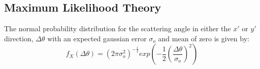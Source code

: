 \documentclass[a4paper,11pt]{article}
\begin{document}














\subsection{Maximum Likelihood Theory}\label{likelihood_theory_section}

The normal probability distribution for the scattering angle in either the $x'$ or $y'$ direction, $\Delta\theta$ with an expected gaussian error $\sigma_o$ and mean of zero is given by:
\begin{equation}
f_X(\Delta\theta) = (2\pi\sigma_o^2)^{-\frac{1}{2}}exp(-\frac{1}{2}(\frac{\Delta\theta}{\sigma_o})^2)
\end{equation}
\end{document}
